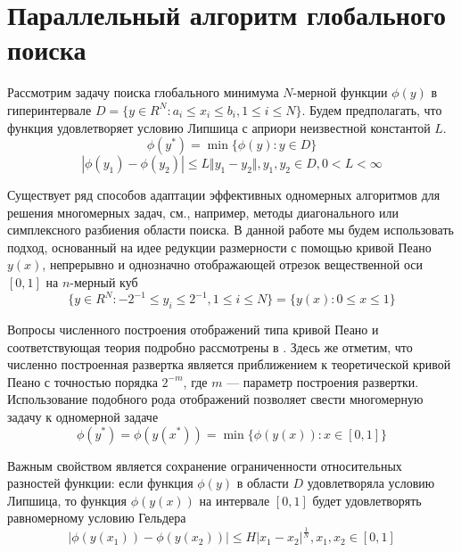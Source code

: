 \section{Параллельный алгоритм глобального поиска}
Рассмотрим задачу поиска глобального минимума \(N\)-мерной функции \(\phi(y)\) в гиперинтервале \(D=\{y\in R^N:a_i\leqslant x_i\leqslant{b_i}, 1\leqslant{i}\leqslant{N}\}\). Будем предполагать, что функция удовлетворяет условию Липшица с априори неизвестной константой \(L\).
\begin{equation}
\label{task}
\phi(y^*)=\min\{\phi(y):y\in D\}
\end{equation}
\begin{equation}
\label{lip}
|\phi(y_1)-\phi(y_2)|\leqslant L\Vert y_1-y_2\Vert,y_1,y_2\in D,0<L<\infty
\end{equation}
\par
Существует ряд способов адаптации эффективных одномерных алгоритмов для решения многомерных задач, см., например, методы диагонального \cite{sergKvaDiaPaper} или симплексного \cite{zilinsk} разбиения области поиска. В данной работе мы будем использовать подход, основанный на идее редукции размерности с помощью кривой Пеано \(y(x)\), непрерывно и однозначно отображающей отрезок вещественной оси \([0,1]\) на \(n\)-мерный куб 
\begin{displaymath}
\label{cube}
\lbrace y\in R^N:-2^{-1}\leqslant y_i\leqslant 2^{-1},1\leqslant i\leqslant N\rbrace=\{y(x):0\leqslant x\leqslant 1\}
\end{displaymath}
\par
Вопросы численного построения отображений типа кривой Пеано и соответствующая теория подробно рассмотрены в \cite{strSergOptBook}. Здесь же отметим, что численно построенная развертка является приближением к теоретической кривой Пеано с точностью порядка \(2^{-m}\), где \(m\) –-- параметр построения развертки. Использование подобного рода отображений позволяет свести многомерную задачу к одномерной задаче
\begin{displaymath}
\label{oneDimTask}
\phi(y^*)=\phi(y(x^*))=\min\{\phi(y(x)):x\in [0,1]\}
\end{displaymath}
\par
Важным свойством является сохранение ограниченности относительных разностей функции: если функция \(\phi(y)\) в области \(D
\) удовлетворяла условию Липшица, то функция \(\phi(y(x))\) на интервале \([0,1]\) будет удовлетворять равномерному условию Гельдера
\begin{displaymath}
\label{holder}
|\phi(y(x_1))-\phi(y(x_2))|\leqslant H{|x_1-x_2|}^{\frac{1}{N}},x_1,x_2\in[0,1]
\end{displaymath}
